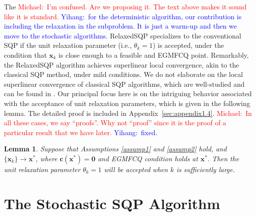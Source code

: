 \documentclass[aos]{imsart}
\numberwithin{equation}{section}
\theoremstyle{plain}
\newtheorem{lemma}{Lemma}
\newcommand{\michael}[1]{\textcolor{red}{Michael:\ #1}}
\newcommand{\yihang}[1]{\textcolor{blue}{Yihang:\ #1}}
\begin{document}
The 
\michael{I'm confused.  Are we proposing it.  The text above makes it sound like it is standard.}
\yihang{for the deterministic algorithm, our contribution is including the relaxation in the subproblem. It is just a warm-up and then we move to the stochastic algorithms.}
RelaxedSQP specializes to the conventional SQP if the unit relaxation parameter (i.e., $\theta_k =1$) is accepted, under the condition that $\bm{x}_k$ is close enough to a feasible and EGMFCQ point. Remarkably, the RelaxedSQP algorithm achieves superlinear local convergence, akin to the classical SQP method, under mild conditions. 
We do not elaborate on the local superlinear convergence of classical SQP algorithms, which are well-studied and can be found in \cite{jorge2006numerical, ulbrich2004superlinear, boggs1995sequential, liu2011sequential, schittkowski2010sequential}. 
Our principal focus here is on the intriguing behavior associated with the acceptance of unit relaxation parameters, which is given in the following lemma. 
The detailed proof is included in Appendix~\ref{sec:appendix1.4}.
\michael{In all these cases, we say ``proofs''. Why not ``proof'' since it is the proof of a particular result that we have later.}
\yihang{fixed.}

\begin{lemma}
\label{theorem_local_relaxation_parameter}
    Suppose that Assumptions \ref{assump1} and \ref{assump2} hold, and $\{\bm{x}_k\} \to \bm{x}^{*}$, where $\bm{c}(\bm{x}^{*}) = \bm{0}$ and EGMFCQ condition holds at $\bm{x}^{*}$. Then the unit relaxation parameter $\theta_k = 1$ will be accepted when $k$ is sufficiently large.
\end{lemma}



\section{The Stochastic SQP Algorithm}
\label{sec:relaxed_stochSQP}
\end{document}
